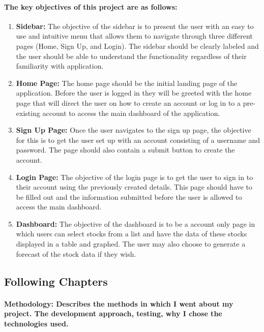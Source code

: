 \paragraph{The key objectives of this project are as follows:}

\begin{enumerate}
    \item \textbf{Sidebar:} The objective of the sidebar is to present the user with an easy to use and intuitive menu that allows them to navigate through three different pages (Home, Sign Up, and Login). The sidebar should be clearly labeled and the user should be able to understand the functionality regardless of their familiarity with application.
    
    \item \textbf{Home Page:} The home page should be the initial landing page of the application. Before the user is logged in they will be greeted with the home page that will direct the user on how to create an account or log in to a pre-existing account to access the main dashboard of the application.
    
    \item \textbf{Sign Up Page:} Once the user navigates to the sign up page, the objective for this is to get the user set up with an account consisting of a username and password. The page should also contain a submit button to create the account.
    
    \item \textbf{Login Page:} The objective of the login page is to get the user to sign in to their account using the previously created details. This page should have to be filled out and the information submitted before the user is allowed to access the main dashboard.
    
    \item \textbf{Dashboard:} The objective of the dashboard is to be a account only page in which users can select stocks from a list and have the data of these stocks displayed in a table and graphed. The user may also choose to generate a forecast of the stock data if they wish.
\end{enumerate}

\subsection{Following Chapters}

\paragraph{Methodology: Describes the methods in which I went about my project. The development approach, testing, why I chose the technologies used.}

